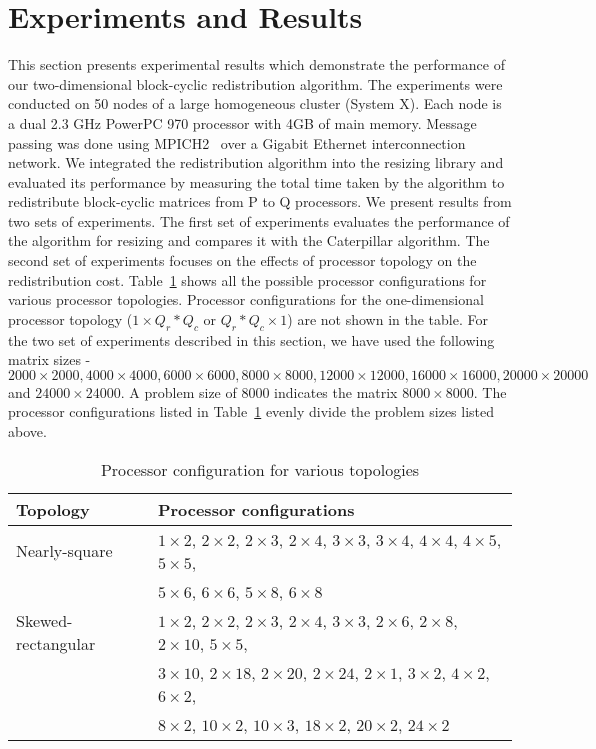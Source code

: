 \documentclass[letterpaper]{llncs}
\begin{document}
\section{Experiments and Results}
\label{sec:experiments}
This section presents experimental results which demonstrate the performance of our two-dimensional block-cyclic redistribution algorithm.
The experiments were conduct\-ed on 50 nodes of a large  homogeneous cluster (System X).  Each node is a dual 2.3 GHz PowerPC 970 processor with 4GB of main memory.
Message passing was done using MPICH2~\cite{mpich2} over a Gigabit Ethernet
interconnection network. We integrated the redistribution algorithm  into the resizing library and evaluated its performance by measuring the total time taken by the algorithm to redistribute block-cyclic matrices  from P to Q processors. 
We present results from two sets of experiments. The first set of experiments evaluates the performance of the algorithm for resizing and compares it with 
the Caterpillar algorithm.
The second set of experiments focuses on the effects of processor topology on the redistribution cost. Table~\ref{tab:procconfig} shows all 
the possible processor configurations for various processor topologies. Processor configurations for the one-dimensional processor topology ($1\times Q_r \ast Q_c$ or $Q_r\ast Q_c \times 1$)  are
not shown in the table. For the two set of experiments described in this section, we have used the following matrix sizes - $2000 \times 2000, 4000 \times 4000, 6000 \times 6000,
8000 \times 8000, 12000 \times 12000, 16000 \times 16000, 20000 \times 20000$ and $24000\times 24000$. 
A problem size of $8000$ indicates the matrix $8000\times 8000$. 
The processor configurations listed in Table~\ref{tab:procconfig} evenly
divide the problem sizes listed above. 

\begin{table}[ht]
\begin{center}
\caption{Processor configuration for various topologies}
\label{tab:procconfig}
\begin{tabular}{|l|l|}
\hline
Topology&Processor configurations \\
\hline
Nearly-square&$1\times2$, $2\times2$, $2\times3$, $2\times4$, $3\times3$, $3\times4$, $4\times4$, $4\times5$, $5\times5$,\\
&$5\times6$, $6\times6$, $5\times8$, $6\times8$\\
\hline
Skewed-rectangular &$1\times2$, $2\times2$, $2\times3$, $2\times4$, $3\times3$, $2\times6$, $2\times8$, $2\times10$, $5\times5$,\\
&$3\times10$, $2\times18$, $2\times20$, $2\times24$, $2\times1$, $3\times2$, $4\times2$, $6\times2$, \\
&$8\times2$, $10\times2$, $10\times3$, $18\times2$, $20\times2$, $24\times2$\\
\hline
\end{tabular}
\end{center}
\end{table}
\end{document}
